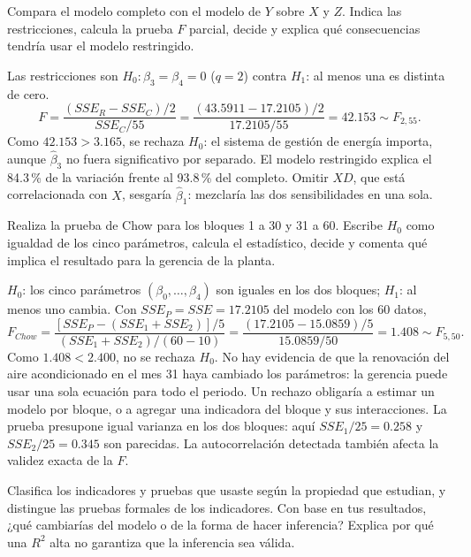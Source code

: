 Compara el modelo completo con el modelo de $Y$ sobre $X$ y $Z$. Indica las restricciones, calcula la prueba $F$ parcial, decide y explica qué consecuencias tendría usar el modelo restringido.

\begin{solucion}
Las restricciones son $H_0:\beta_3=\beta_4=0$ ($q=2$) contra $H_1$: al menos una es distinta de cero.
\[
F=\frac{(SSE_R-SSE_C)/2}{SSE_C/55}=\frac{(43.5911-17.2105)/2}{17.2105/55}=42.153\sim F_{2,55}.
\]
Como $42.153>3.165$, se rechaza $H_0$: el sistema de gestión de energía importa, aunque $\hat\beta_3$ no fuera significativo por separado. El modelo restringido explica el 84.3\,\% de la variación frente al 93.8\,\% del completo. Omitir $XD$, que está correlacionada con $X$, sesgaría $\hat\beta_1$: mezclaría las dos sensibilidades en una sola.
\end{solucion}

Realiza la prueba de Chow para los bloques 1 a 30 y 31 a 60. Escribe $H_0$ como igualdad de los cinco parámetros, calcula el estadístico, decide y comenta qué implica el resultado para la gerencia de la planta.

\begin{solucion}
$H_0$: los cinco parámetros $(\beta_0,\dots,\beta_4)$ son iguales en los dos bloques; $H_1$: al menos uno cambia. Con $SSE_P=SSE=17.2105$ del modelo con los 60 datos,
\[
F_{Chow}=\frac{[SSE_P-(SSE_1+SSE_2)]/5}{(SSE_1+SSE_2)/(60-10)}=\frac{(17.2105-15.0859)/5}{15.0859/50}=1.408\sim F_{5,50}.
\]
Como $1.408<2.400$, no se rechaza $H_0$. No hay evidencia de que la renovación del aire acondicionado en el mes 31 haya cambiado los parámetros: la gerencia puede usar una sola ecuación para todo el periodo. Un rechazo obligaría a estimar un modelo por bloque, o a agregar una indicadora del bloque y sus interacciones. La prueba presupone igual varianza en los dos bloques: aquí $SSE_1/25=0.258$ y $SSE_2/25=0.345$ son parecidas. La autocorrelación detectada también afecta la validez exacta de la $F$.
\end{solucion}

Clasifica los indicadores y pruebas que usaste según la propiedad que estudian, y distingue las pruebas formales de los indicadores. Con base en tus resultados, ¿qué cambiarías del modelo o de la forma de hacer inferencia? Explica por qué una $R^2$ alta no garantiza que la inferencia sea válida.

